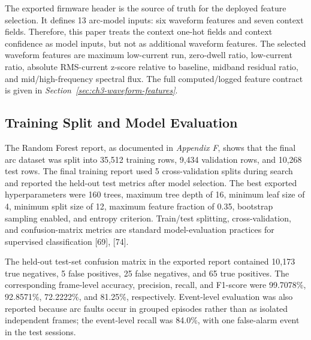 The exported firmware header is the source of truth for the deployed feature
selection. It defines 13 arc-model inputs: six waveform features and seven
context fields. Therefore, this paper treats the context one-hot fields
and context confidence as model inputs, but not as additional waveform
features. The selected waveform features are maximum low-current run,
zero-dwell ratio, low-current ratio, absolute RMS-current z-score relative to
baseline, midband residual ratio, and mid/high-frequency spectral flux. The
full computed/logged feature contract is given in
\textit{Section~\ref{sec:ch3-waveform-features}}.

\subsection{Training Split and Model Evaluation}
\label{sec:ch3-training-split}

The Random Forest report, as documented in \textit{Appendix F}, shows that the final arc dataset was split into
35,512 training rows, 9,434 validation rows, and 10,268 test rows. The final
training report used 5 cross-validation splits during search and reported the
held-out test metrics after model selection. The best exported hyperparameters
were 160 trees, maximum tree depth of 16, minimum leaf size of 4, minimum split
size of 12, maximum feature fraction of 0.35, bootstrap sampling enabled, and
entropy criterion. Train/test splitting, cross-validation, and confusion-matrix
metrics are standard model-evaluation practices for supervised classification
[69], [74].

The held-out test-set confusion matrix in the exported report contained 10,173
true negatives, 5 false positives, 25 false negatives, and 65 true positives.
The corresponding frame-level accuracy, precision, recall, and F1-score were
99.7078\%, 92.8571\%, 72.2222\%, and 81.25\%, respectively. Event-level
evaluation was also reported because arc faults occur in grouped episodes
rather than as isolated independent frames; the event-level recall was 84.0\%,
with one false-alarm event in the test sessions.
